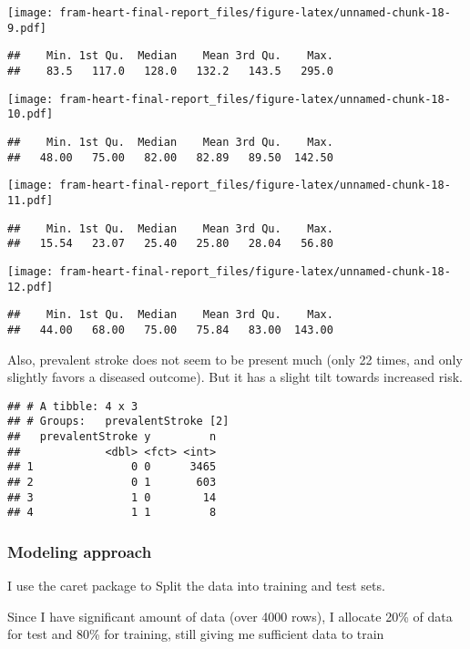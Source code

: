 \documentclass[]{article}
\begin{document}
\texttt{[image: fram-heart-final-report\_files/figure-latex/unnamed-chunk-18-9.pdf]}

\begin{verbatim}
##    Min. 1st Qu.  Median    Mean 3rd Qu.    Max. 
##    83.5   117.0   128.0   132.2   143.5   295.0
\end{verbatim}

\texttt{[image: fram-heart-final-report\_files/figure-latex/unnamed-chunk-18-10.pdf]}

\begin{verbatim}
##    Min. 1st Qu.  Median    Mean 3rd Qu.    Max. 
##   48.00   75.00   82.00   82.89   89.50  142.50
\end{verbatim}

\texttt{[image: fram-heart-final-report\_files/figure-latex/unnamed-chunk-18-11.pdf]}

\begin{verbatim}
##    Min. 1st Qu.  Median    Mean 3rd Qu.    Max. 
##   15.54   23.07   25.40   25.80   28.04   56.80
\end{verbatim}

\texttt{[image: fram-heart-final-report\_files/figure-latex/unnamed-chunk-18-12.pdf]}

\begin{verbatim}
##    Min. 1st Qu.  Median    Mean 3rd Qu.    Max. 
##   44.00   68.00   75.00   75.84   83.00  143.00
\end{verbatim}

Also, prevalent stroke does not seem to be present much (only 22 times,
and only slightly favors a diseased outcome). But it has a slight tilt
towards increased risk.

\begin{verbatim}
## # A tibble: 4 x 3
## # Groups:   prevalentStroke [2]
##   prevalentStroke y         n
##             <dbl> <fct> <int>
## 1               0 0      3465
## 2               0 1       603
## 3               1 0        14
## 4               1 1         8
\end{verbatim}

\subsubsection{Modeling approach}\label{modeling-approach}

I use the caret package to Split the data into training and test sets.

Since I have significant amount of data (over 4000 rows), I allocate
20\% of data for test and 80\% for training, still giving me sufficient
data to train
\end{document}
